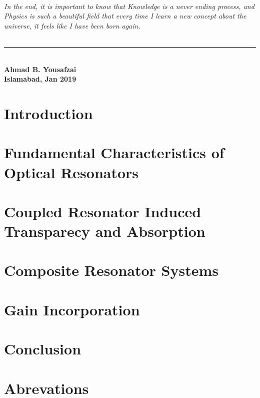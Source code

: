 \documentclass[12pt,twoside]{report}
\begin{document}
\subparagraph*{ \normalfont	In the end, it is important to know that Knowledge is a never ending process, and Physics is such a beautiful field that every time I learn a new concept about the universe, it feels like I have been born again.}
\begin{flushleft}
\noindent\rule{5cm}{0.5pt}\\
\textbf{\small Ahmad B. Yousafzai}\\
\textbf{\small Islamabad, Jan 2019}
\end{flushleft}


\begin{scriptsize}
\small \tableofcontents
\end{scriptsize}
\small \listoffigures
\newpage
{}
\fancyhead[RO,LE]{}
\fancyfoot[LE,RO]{\thepage}
\renewcommand{\footrulewidth}{0.5pt}

\pagestyle{fancy}

\chapter{Introduction}

 
\chapter{Fundamental Characteristics of Optical Resonators}

 
\chapter{Coupled Resonator Induced Transparecy and Absorption}

 
\chapter{Composite Resonator Systems}

 
\chapter{Gain Incorporation}


\chapter{Conclusion}

\appendix
\chapter{Abrevations}

\end{document}

